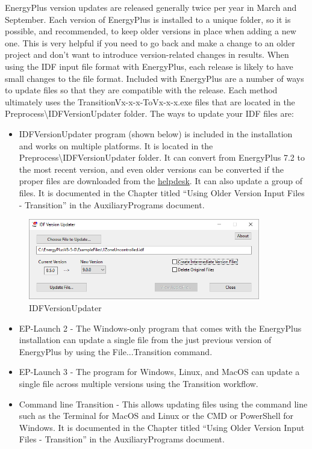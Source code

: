 EnergyPlus version updates are released generally twice per year in
March and September. Each version of EnergyPlus is installed to a
unique folder, so it is possible, and recommended, to keep older versions
in place when adding a new one. This is very helpful if you need to
go back and make a change to an older project and don't want to introduce
version-related changes in results. When using the IDF input file
format with EnergyPlus, each release is likely to have small changes
to the file format. Included with EnergyPlus are a number of ways
to update files so that they are compatible with the release. Each
method ultimately uses the TransitionVx-x-x-ToVx-x-x.exe files that
are located in the Preprocess\textbackslash IDFVersionUpdater folder.
The ways to update your IDF files are:
\begin{itemize}
\item IDFVersionUpdater program (shown below) is included in the installation
and works on multiple platforms. It is located in the Preprocess\textbackslash IDFVersionUpdater
folder. It can convert from EnergyPlus 7.2 to the most recent version,
and even older versions can be converted if the proper files are downloaded
from the \href{http://energyplus.helpserve.com/Knowledgebase/List/Index/46/converting-older-version-files}{helpdesk}.
It can also update a group of files. It is documented in the Chapter
titled ``Using Older Version Input Files - Transition'' in the AuxiliaryPrograms
document.
\end{itemize}

\begin{figure}[hbtp] 
\centering
\includegraphics[width=0.9\textwidth, height=0.9\textheight, keepaspectratio=true]{media/IDFVersionUpdater.png}
\caption{IDFVersionUpdater}
\end{figure}

\begin{itemize}
\item EP-Launch 2 - The Windows-only program that comes with the EnergyPlus
installation can update a single file from the just previous version
of EnergyPlus by using the File...Transition command.
\item EP-Launch 3 - The program for Windows, Linux, and MacOS can update
a single file across multiple versions using the Transition workflow.
\item Command line Transition - This allows updating files using the command
line such as the Terminal for MacOS and Linux or the CMD or PowerShell
for Windows. It is documented in the Chapter titled ``Using Older
Version Input Files - Transition'' in the AuxiliaryPrograms document.
\end{itemize}

